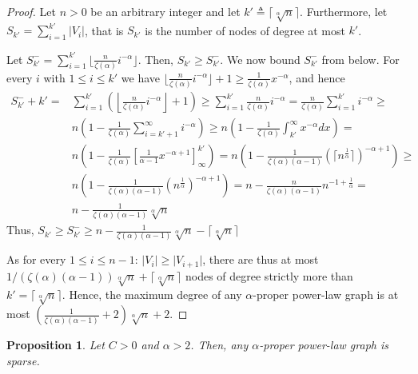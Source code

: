 \documentclass{article}
\newtheorem{proposition}{Proposition}
\theoremstyle{remark}
\begin{document}
\begin{proof}
Let $n > 0$ be an arbitrary integer and let $k' \triangleq \lceil \sqrt[\alpha]{n} \rceil$. 
Furthermore, let $S_{k'} = \sum_{i=1}^{k'} |V_i|$, that is $S_{k'}$ is the number of nodes of degree at most $k'$.

Let $S^{-}_{k'} = \sum_{i=1}^{k'} \lfloor \frac{n}{\zeta(\alpha)} i^{-\alpha}\rfloor$. Then,
$S_{k'} \geq S^{-}_{k'}$. We now bound $S^{-}_{k'}$ from below.
For every $i$ with $1 \leq i \leq k'$ we have $\lfloor \frac{n}{\zeta(\alpha)} i^{-\alpha}\rfloor + 1\geq \frac{1}{\zeta(\alpha)} x^{-\alpha}$, and hence
\begin{align*}
S^{-}_{k'} + k' = &\sum_{i=1}^{k'} \left(\left\lfloor \frac{n}{\zeta(\alpha)} i^{-\alpha}\right\rfloor + 1\right) \geq  \sum_{i=1}^{k'} \frac{n}{\zeta(\alpha)} i^{- \alpha}  = \frac{n}{\zeta(\alpha)} \sum_{i=1}^{k'} i^{-\alpha} \geq \\
&n \left(1 - \frac{1}{\zeta(\alpha)} \sum_{i=k'+1}^{\infty} i^{-\alpha} \right) 
 \geq n \left( 1 - \frac{1}{\zeta(\alpha)}\int_{k'}^\infty x^{-\alpha} dx \right) = \\ 
 &n \left( 1 - \frac{1}{\zeta(\alpha)} \left[ \frac{1}{\alpha - 1} x^{-\alpha + 1}\right]_{\infty}^{k'}\right) = 
n \left( 1 - \frac{1}{\zeta(\alpha) (\alpha - 1)} \left( \lceil n^{\frac{1}{\alpha}} \rceil \right)^{-\alpha + 1}\right) \geq \\
 &n \left( 1 -  \frac{1}{\zeta(\alpha) (\alpha - 1)} \left( n^{\frac{1}{\alpha}} \right)^{-\alpha + 1} \right) = n - \frac{n}{\zeta(\alpha) (\alpha - 1)}n^{-1+\frac{1}{\alpha}} = \\
&n - \frac{1}{\zeta(\alpha) (\alpha - 1)}\sqrt[\alpha]{n}
\end{align*}
Thus, $S_{k'} \geq S^{-}_{k'} \geq n - \frac{1}{\zeta(\alpha) (\alpha - 1)}\sqrt[\alpha]{n} - \lceil \sqrt[\alpha]{n} \rceil$

As for every $1 \leq i \leq n-1$: $\vert V_i \vert \geq \vert V_{i+1} \vert$,
there are thus at most $1/(\zeta(\alpha) (\alpha - 1)) \sqrt[\alpha]{n} + \lceil \sqrt[\alpha]{n} \rceil$ nodes of degree strictly more than $k' = \lceil \sqrt[\alpha]{n} \rceil$. Hence, the maximum degree of any $\alpha$-proper power-law graph is at most $\left(\frac{1}{\zeta(\alpha) (\alpha - 1)} + 2\right) \sqrt[\alpha]{n} + 2$.
\end{proof}

\begin{proposition}
Let $C > 0$ and $\alpha > 2$. Then, any $\alpha$-proper power-law graph is sparse.
\end{proposition}
\end{document}
